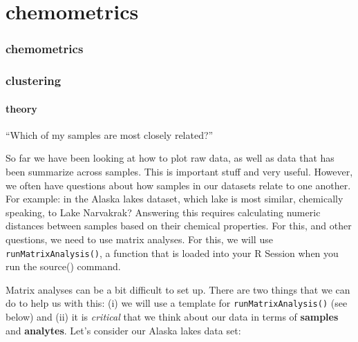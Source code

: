 \documentclass[
]{krantz}
\begin{document}
\hypertarget{part-chemometrics}{%
\part{chemometrics}\label{part-chemometrics}}

\hypertarget{chemometrics}{%
\section*{chemometrics}\label{chemometrics}}

\hypertarget{clustering}{%
\section{clustering}\label{clustering}}

\hypertarget{theory}{%
\subsection{theory}\label{theory}}

``Which of my samples are most closely related?''

So far we have been looking at how to plot raw data, as well as data that has been summarize across samples. This is important stuff and very useful. However, we often have questions about how samples in our datasets relate to one another. For example: in the Alaska lakes dataset, which lake is most similar, chemically speaking, to Lake Narvakrak? Answering this requires calculating numeric distances between samples based on their chemical properties. For this, and other questions, we need to use matrix analyses. For this, we will use \texttt{runMatrixAnalysis()}, a function that is loaded into your R Session when you run the source() command.

Matrix analyses can be a bit difficult to set up. There are two things that we can do to help us with this: (i) we will use a template for \texttt{runMatrixAnalysis()} (see below) and (ii) it is \emph{critical} that we think about our data in terms of \textbf{samples} and \textbf{analytes}. Let's consider our Alaska lakes data set:
\end{document}
